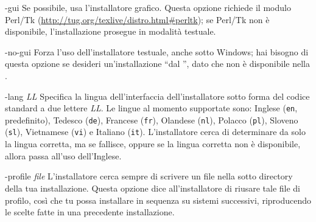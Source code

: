 \documentclass{article}
\begin{document}
\begin{ttdescription}
\item[-gui] Se possibile, usa l'installatore grafico. Questa opzione
  richiede il modulo Perl/Tk
  (\url{http://tug.org/texlive/distro.html#perltk}); se Perl/Tk non è
  disponibile, l'installazione prosegue in modalità testuale.

\item[-no-gui] Forza l'uso dell'installatore testuale, anche sotto
  Windows; hai bisogno di questa opzione se desideri un'installazione
  ``dal \DVD'', dato che non è disponibile nella \GUI.

\item[-lang {\sl LL}] Specifica la lingua dell'interfaccia
  dell'installatore sotto forma del codice standard a due lettere
  \textsl{LL}. Le lingue al momento supportate sono: Inglese
  (\texttt{en}, predefinito), Tedesco (\texttt{de}), Francese
  (\texttt{fr}), Olandese (\texttt{nl}), Polacco (\texttt{pl}), Sloveno
  (\texttt{sl}), Vietnamese (\texttt{vi}) e Italiano (\texttt{it}).
  L'installatore cerca di determinare da solo la lingua corretta, ma se
  fallisce, oppure se la lingua corretta non è disponibile, allora passa
  all'uso dell'Inglese.

\item[-profile {\sl file}] L'installatore cerca sempre di scrivere un file
   nella sotto directory  della
  tua installazione. Questa opzione dice all'installatore di riusare tale
  file di profilo, così che tu possa installare in sequenza su sistemi
  successivi, riproducendo le scelte fatte in una precedente
  installazione.


\end{ttdescription}
\end{document}

